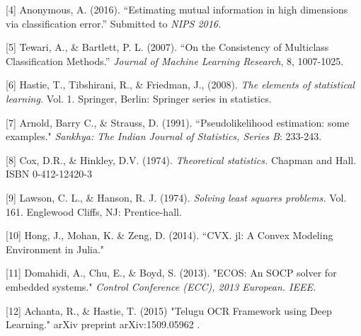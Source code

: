\documentclass[12pt]{article}
\begin{document}
[4] Anonymous, A. (2016). ``Estimating mutual information in high dimensions via classification error.''  Submitted to 
\emph{NIPS 2016.}

[5] Tewari, A., \& Bartlett, P. L. (2007). ``On the Consistency of Multiclass Classification Methods.''
\emph{Journal of Machine Learning Research}, 8, 1007-1025.

[6] Hastie, T., Tibshirani, R., \& Friedman, J., (2008). \emph{The elements
of statistical learning.} Vol. 1. Springer, Berlin: Springer series in
statistics.

[7] Arnold, Barry C., \& Strauss, D.  (1991). ``Pseudolikelihood estimation: some examples." \emph{Sankhya: The Indian Journal of Statistics, Series B}: 233-243.

[8] Cox, D.R., \& Hinkley, D.V. (1974). \emph{Theoretical statistics.} Chapman and Hall. ISBN 0-412-12420-3

[9] Lawson, C. L., \& Hanson, R. J. (1974). \emph{Solving least squares problems.} Vol. 161. Englewood Cliffs, NJ: Prentice-hall.

[10] Hong, J., Mohan, K. \& Zeng, D. (2014). ``CVX. jl: A Convex Modeling Environment in Julia."

[11] Domahidi, A., Chu, E., \& Boyd, S. (2013). "ECOS: An SOCP solver for embedded systems." \emph{Control Conference (ECC), 2013 European. IEEE.}

[12] Achanta, R., \& Hastie, T. (2015) "Telugu OCR Framework using Deep Learning." arXiv preprint arXiv:1509.05962 .
\end{document}
